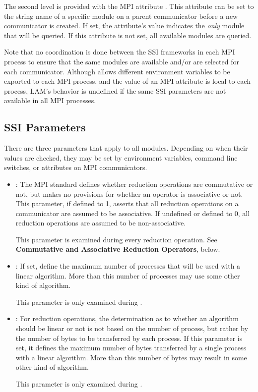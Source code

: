 The second level is provided with the MPI attribute
.  This attribute can be set to
the string name of a specific  module on a parent
communicator before a new communicator is created.  If set, the
attribute's value indicates the {\em only} module that will be
queried.  If this attribute is not set, all available modules are
queried.

Note that no coordination is done between the SSI frameworks in each
MPI process to ensure that the same modules are available and/or are
selected for each communicator.  Although  allows
different environment variables to be exported to each MPI process,
and the value of an MPI attribute is local to each process, LAM's
behavior is undefined if the same SSI parameters are not available in
all MPI processes.


\subsection{ SSI Parameters}

There are three parameters that apply to all  modules.
Depending on when their values are checked, they may be set by
environment variables, command line switches, or attributes on MPI
communicators.

\begin{itemize}
\item {}: The MPI standard defines
  whether reduction operations are commutative or not, but makes no
  provisions for whether an operator is associative or not.  This
  parameter, if defined to 1, asserts that all reduction operations on
  a communicator are assumed to be associative.  If undefined or
  defined to 0, all reduction operations are assumed to be
  non-associative.  
  
  This parameter is examined during every reduction operation.  See
  {\bf Commutative and Associative Reduction Operators}, below.
  
\item {}: If set, define the maximum number
  of processes that will be used with a linear algorithm.  More than
  this number of processes may use some other kind of algorithm.

  This parameter is only examined during .
  
\item {}: For reduction
  operations, the determination as to whether an algorithm should be
  linear or not is not based on the number of process, but rather by
  the number of bytes to be transferred by each process.  If this
  parameter is set, it defines the maximum number of bytes transferred
  by a single process with a linear algorithm.  More than this number
  of bytes may result in some other kind of algorithm.

  This parameter is only examined during .
\end{itemize}

